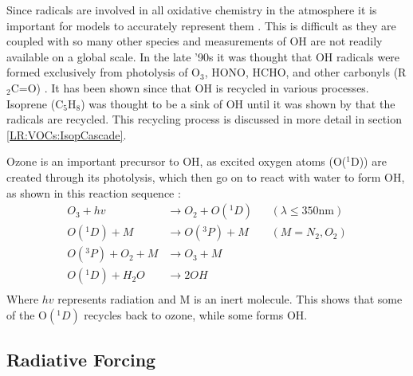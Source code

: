     Since radicals are involved in all oxidative chemistry in the atmosphere it is important for models to accurately represent them \parencite[e.g.][]{Travis2016}.
    This is difficult as they are coupled with so many other species and measurements of OH are not readily available on a global scale.
    In the late '90s it was thought that OH radicals were formed exclusively from photolysis of O$_3$, HONO, HCHO, and other carbonyls (R$_2$C=O) \parencite{Atkinson2000}.
    It has been shown since that OH is recycled in various processes.
    Isoprene (C$_5$H$_8$) was thought to be a sink of OH until it was shown by \textcite{Paulot2009b} that the radicals are recycled.
    This recycling process is discussed in more detail in section \ref{LR:VOCs:IsopCascade}.
    
    Ozone is an important precursor to OH, as excited oxygen atoms (O(${}^1$D)) are created through its photolysis, which then go on to react with water to form OH, as shown in this reaction sequence \parencite{Atkinson2000, AtkinsonArey2003}:
    \begin{equation}
      \begin{aligned}
        O_3+hv            & \to  O_2 + O({}^1D)   && (\lambda \le 350 \text{nm}) \\%
        O({}^1D)+M        & \to  O({}^3P) + M     && (M=N_2, O_2)               \\%
        O({}^3P)+O_2 + M  & \to  O_3 + M          &&                           \\%
        O({}^1D)+H_2O     & \to  2OH              &&                            \\%
      \end{aligned}
      \label{LR:Atmos:Chem:eqn_O3toOH}
    \end{equation}
    Where $hv$ represents radiation and M is an inert molecule.
    This shows that some of the O$({}^1D)$ recycles back to ozone, while some forms OH.
      
  \subsection{Radiative Forcing}
    \label{LR:VOCs:IsopCascade:RF}
    
